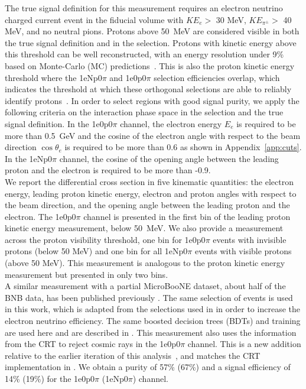 \documentclass[amsmath,amssymb,aps,prd,showpacs,twocolumn,superscriptaddress,letterpaper,longbibliography, floatfix]{revtex4-2}
\begin{document}
The true signal definition for this measurement requires an electron neutrino charged current event in the fiducial volume with $KE_e >$ 30 MeV, $KE_{\pi^{\pm}} >$ 40 MeV, and no neutral pions.  
Protons above 50~MeV are considered visible in both the true signal definition and in the selection. 
Protons with kinetic energy above this threshold can be well reconstructed, with an energy resolution under 9\% based on Monte-Carlo (MC) predictions~\cite{oldPELEE}.
This is also the proton kinetic energy threshold where the 1eNp0$\pi$ and 1e0p0$\pi$ selection efficiencies overlap, which indicates the threshold at which these orthogonal selections are able to reliably identify protons~\cite{MicroBooNEXsec}. 
In order to select regions with good signal purity, we apply the following criteria on the interaction phase space in the selection and the true signal definition. In the 1e0p0$\pi$ channel, the electron energy $E_e$ is required to be more than 0.5~GeV and the cosine of the electron angle with respect to the beam direction $\cos\theta_e$ is required to be more than 0.6 as shown in Appendix~\ref{app:cuts}. In the 1eNp0$\pi$ channel, the cosine of the opening angle between the leading proton and the electron is required to be more than -0.9.\\

We report the differential cross section in five kinematic quantities: the electron energy, leading proton kinetic energy, electron and proton angles with respect to the beam direction, and the opening angle between the leading proton and the electron. The 1e0p0$\pi$ channel is presented in the first bin of the leading proton kinetic energy measurement, below 50~MeV. We also provide a measurement across the proton visibility threshold, one bin for 1e0p0$\pi$ events with invisible protons (below 50 MeV) and one bin for all 1eNp0$\pi$ events with visible protons (above 50 MeV). This measurement is analogous to the proton kinetic energy measurement but presented in only two bins.\\

A similar measurement with a partial MicroBooNE dataset, about half of the BNB data, has been published previously \cite{MicroBooNEXsec}. The same selection of events is used in this work, which is adapted from the selections used in \cite{oldPELEE,PELEEnew} in order to increase the electron neutrino efficiency. The same boosted decision trees (BDTs) and training are used here and are described in \cite{oldPELEE}. 
This measurement also uses the information from the CRT to reject cosmic rays in the 1e0p0$\pi$ channel. This is a new addition relative to the earlier iteration of this analysis~\cite{MicroBooNEXsec}, and matches the CRT implementation in \cite{PELEEnew}.
We obtain a purity of 57\% (67\%) and a signal efficiency of 14\% (19\%) for the 1e0p0$\pi$ (1eNp0$\pi$) channel.\\
\end{document}
